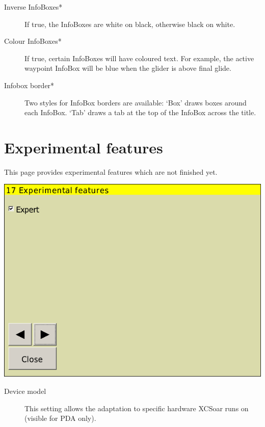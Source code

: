\begin{description}
\item[Inverse InfoBoxes*]  If true, the InfoBoxes are white on black, otherwise black on white.
\item[Colour InfoBoxes*]  If true, certain InfoBoxes will have coloured text. For example, the 
active waypoint InfoBox will be blue when the glider is above final glide.
\item[Infobox border*]  Two styles for InfoBox borders are available: `Box'
draws boxes around each InfoBox.  `Tab' draws a tab at the top of the InfoBox across the title.
\end{description}




\clearpage
\section{Experimental features}

This page provides experimental features which are not finished yet.

\begin{center}
\includegraphics[angle=0,width=0.8\linewidth,keepaspectratio='true']{figures/config-exp.png}
\end{center}

\begin{description}
\item[Device model] This setting allows the adaptation to specific hardware
XCSoar runs on (visible for PDA only).
\end{description}
